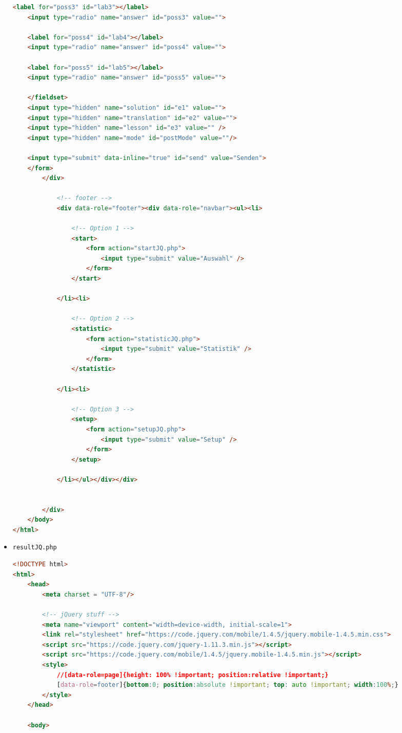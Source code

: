 \documentclass{scrartcl}
\begin{document}
\begin{itemize}
\begin{lstlisting}[language=html]
	<label for="poss3" id="lab3"></label>
	<input type="radio" name="answer" id="poss3" value="">

	<label for="poss4" id="lab4"></label>
	<input type="radio" name="answer" id="poss4" value="">

	<label for="poss5" id="lab5"></label>
	<input type="radio" name="answer" id="poss5" value="">

	</fieldset>
	<input type="hidden" name="solution" id="e1" value="">
	<input type="hidden" name="translation" id="e2" value="">
	<input type="hidden" name="lesson" id="e3" value="" />
	<input type="hidden" name="mode" id="postMode" value=""/>

	<input type="submit" data-inline="true" id="send" value="Senden">
	</form>
		</div>

			<!-- footer -->
			<div data-role="footer"><div data-role="navbar"><ul><li>

				<!-- Option 1 -->
				<start>
					<form action="startJQ.php">
						<input type="submit" value="Auswahl" />
					</form>
				</start>

			</li><li>

				<!-- Option 2 -->
				<statistic>
					<form action="statisticJQ.php">
						<input type="submit" value="Statistik" />
					</form>
				</statistic>

			</li><li>

				<!-- Option 3 -->
				<setup>
					<form action="setupJQ.php">
						<input type="submit" value="Setup" />
					</form>
				</setup>

			</li></ul></div></div>


		</div> 
	</body>
</html>
\end{lstlisting}
\item \lstinline`resultJQ.php`
\begin{lstlisting}[language=html]
<!DOCTYPE html>
<html>
	<head>
		<meta charset = "UTF-8"/>

		<!-- jQuery stuff -->
		<meta name="viewport" content="width=device-width, initial-scale=1">
		<link rel="stylesheet" href="https://code.jquery.com/mobile/1.4.5/jquery.mobile-1.4.5.min.css">
		<script src="https://code.jquery.com/jquery-1.11.3.min.js"></script>
		<script src="https://code.jquery.com/mobile/1.4.5/jquery.mobile-1.4.5.min.js"></script>
		<style>
			//[data-role=page]{height: 100% !important; position:relative !important;}
			[data-role=footer]{bottom:0; position:absolute !important; top: auto !important; width:100%;}
		</style>
	</head>

	<body>	


\end{lstlisting}
\end{itemize}
\end{document}
